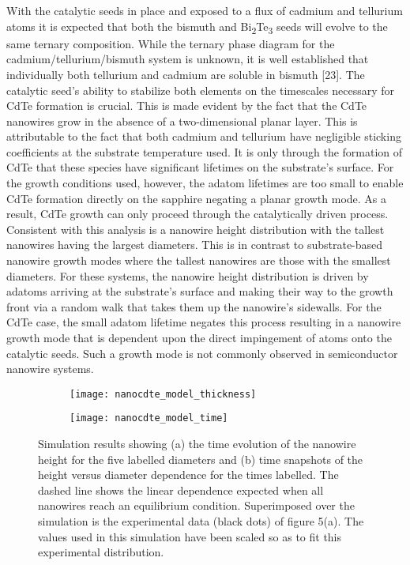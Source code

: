 With the catalytic seeds in place and exposed to a
flux of cadmium and tellurium atoms it is expected that
both the bismuth and Bi\textsubscript{2}Te\textsubscript{3} seeds will evolve to the same
ternary composition. While the ternary phase diagram for
the cadmium/tellurium/bismuth system is unknown, it is well
established that individually both tellurium and cadmium are
soluble in bismuth [23]. The catalytic seed's ability to stabilize
both elements on the timescales necessary for CdTe formation
is crucial. This is made evident by the fact that the CdTe
nanowires grow in the absence of a two-dimensional planar
layer. This is attributable to the fact that both cadmium and
tellurium have negligible sticking coefficients at the substrate
temperature used. It is only through the formation of CdTe
that these species have significant lifetimes on the substrate's
surface. For the growth conditions used, however, the adatom
lifetimes are too small to enable CdTe formation directly on the sapphire negating a planar growth mode. As a result, CdTe growth can only proceed through the catalytically
driven process. Consistent with this analysis is a nanowire
height distribution with the tallest nanowires having the largest
diameters. This is in contrast to substrate-based nanowire
growth modes where the tallest nanowires are those with the
smallest diameters. For these systems, the nanowire height
distribution is driven by adatoms arriving at the substrate's
surface and making their way to the growth front via a random
walk that takes them up the nanowire's sidewalls. For the CdTe
case, the small adatom lifetime negates this process resulting
in a nanowire growth mode that is dependent upon the direct
impingement of atoms onto the catalytic seeds. Such a growth
mode is not commonly observed in semiconductor nanowire
systems.
\begin{figure}
    \centering
    \begin{subfigure}[t]{0.5\textwidth}
        \centering
        \texttt{[image: nanocdte\_model\_thickness]}
        \caption{\label{fig:nanocdte_model_thickness}}
    \end{subfigure}%
    \begin{subfigure}[t]{0.5\textwidth}
        \centering
        \texttt{[image: nanocdte\_model\_time]}
        \caption{\label{fig:nanocdte_model_time}}
    \end{subfigure}
    \caption{\label{fig:nanocdte_model}Simulation results showing (a) the time evolution of the nanowire height for the five labelled diameters and (b) time snapshots of the
        height versus diameter dependence for the times labelled. The dashed line shows the linear dependence expected when all nanowires reach an
        equilibrium condition. Superimposed over the simulation is the experimental data (black dots) of figure 5(a). The values used in this
        simulation have been scaled so as to fit this experimental distribution.}
\end{figure}

